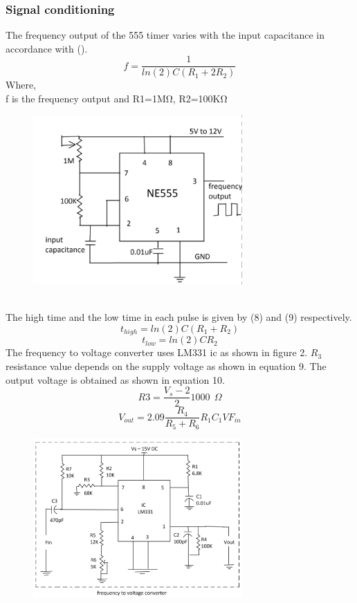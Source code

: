 \documentclass[conference]{IEEEtran}
\begin{document}
\subsubsection{Signal conditioning}
The frequency output of the 555 timer varies with the input capacitance in accordance with ().\\
\begin{equation}\label{eq:3}
f=\frac{1}{ln (2)C(R_1+2R_2)}
\end{equation}
Where, \\
f is the frequency output and R1=1MΩ, R2=100KΩ
\begin{figure}[h]
\includegraphics[width=8cm]{ctof.png}
\centering
\end{figure}
\\The high time and the low time in each pulse is given by (8) and (9) respectively.\\
\begin{equation} \label{eq:4}
t_{high}= ln(2)C(R_1+R_2)                    
\end{equation}
\begin{equation} \label{eq:5}
t_{low}= ln(2)CR_2                          
\end{equation}
The frequency to voltage converter uses LM331 ic as shown in figure 2. $R_3$ resistance value depends on the supply voltage as shown in equation 9. The output voltage is obtained as shown in equation 10.\\

\begin{equation} \label{eq:6}
 R3= \frac{V_s-2}{2}1000\ \ \Omega           
 \end{equation}               
\begin{equation} \label{eq:4}
V_{out} = 2.09\frac{R_4}{R_5+R_6}R_1C_1VF_{in}  
\end{equation}            
\begin{figure}[h]
\includegraphics[width=8cm]{ftov.png}
\centering
\end{figure}
\end{document}
